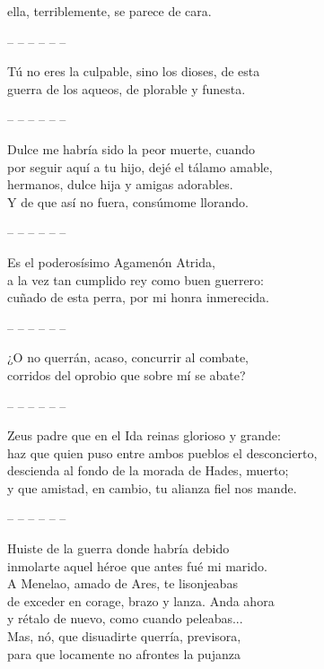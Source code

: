 \documentclass[11pt,twoside]{article}
\begin{document}
ella, terriblemente, se parece de cara.\par
\pend
%
\noindent-- -- -- -- -- --\par
%
\pstart
{}
Tú no eres la culpable, sino los dioses, de esta\\
guerra de los aqueos, de plorable y funesta.\par
\pend
%
\noindent-- -- -- -- -- --\par
%
\pstart
{}
Dulce me habría sido la peor muerte, cuando\\
por seguir aquí a tu hijo, dejé el tálamo amable,\\
hermanos, dulce hija y amigas adorables.\\
Y de que así no fuera, consúmome llorando.\par
\pend
%
\noindent-- -- -- -- -- --\par
%
\pstart
{}
Es el poderosísimo Agamenón Atrida,\\
a la vez tan cumplido rey como buen guerrero:\\
cuñado de esta perra, por mi honra inmerecida.\par
\pend
%
\noindent-- -- -- -- -- --\par
%
\pstart
{}
¿O no querrán, acaso, concurrir al combate,\\
corridos del oprobio que sobre mí se abate?\par
\pend
%
\noindent-- -- -- -- -- --\par
%
\pstart
{}
Zeus padre que en el Ida reinas glorioso y grande:\\
haz que quien puso entre ambos pueblos el desconcierto,\\
descienda al fondo de la morada de Hades, muerto;\\
y que amistad, en cambio, tu alianza fiel nos mande.\par
\pend
%
\noindent-- -- -- -- -- --\par
%
\pstart
{}
Huiste de la guerra donde habría debido\\
inmolarte aquel héroe que antes fué mi marido.\\
A Menelao, amado de Ares, te lisonjeabas\\
de exceder en corage, brazo y lanza. Anda ahora\\
y rétalo de nuevo, como cuando peleabas...\\
Mas, nó, que disuadirte querría, previsora,\\
para que locamente no afrontes la pujanza\\
\end{document}
